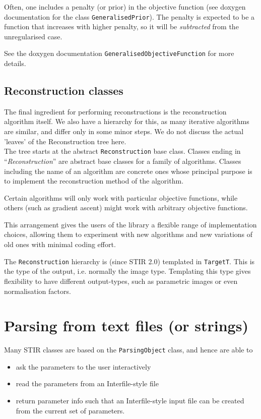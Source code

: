 \documentclass{article}
\begin{document}
Often, one includes a penalty (or prior) in the objective function
(see doxygen documentation for the class \texttt{GeneralisedPrior}).
The penalty is expected to be a function that increases with higher 
penalty, so it will be \textit{subtracted}
from the unregularised case.

See the doxygen documentation \texttt{GeneralisedObjectiveFunction} for
more details.

\subsection{
Reconstruction classes}

The final ingredient for performing reconstructions is the reconstruction 
algorithm itself. We also have a hierarchy for this, as many 
iterative algorithms are similar, and differ only in some minor 
steps. We do not discuss the actual 'leaves' of the Reconstruction 
tree here.
\\
The tree starts at the abstract \texttt{Reconstruction} base class. Classes 
ending in ``\textit{Reconstruction}'' are abstract base classes for 
a family of algorithms. Classes including the name of an algorithm 
are concrete ones whose principal purpose is to implement the 
reconstruction method of the algorithm. 

Certain algorithms will only work with particular objective functions,
while others (such as gradient ascent) might work with arbitrary
objective functions.

This arrangement gives the users 
of the library a flexible range of implementation choices, allowing 
them to experiment with new algorithms and new variations of 
old ones with minimal coding effort.

The \texttt{Reconstruction} hierarchy is (since STIR 2.0) templated in 
\texttt{TargetT}. This is the type of the output, i.e. normally
the image type. Templating this type gives flexibility to have
different output-types, such as parametric images or even 
normalisation factors.

\section{
Parsing from text files (or strings)\label{sect:parsing}}
Many STIR classes are based on the \texttt{ParsingObject} class, and hence 
are able to
\begin{itemize}
\item 
ask the parameters to the user interactively
\item 
read the parameters from an Interfile-style file
\item 
return parameter info such that an Interfile-style input file 
can be created from the current set of parameters.
\end{itemize}
\end{document}
